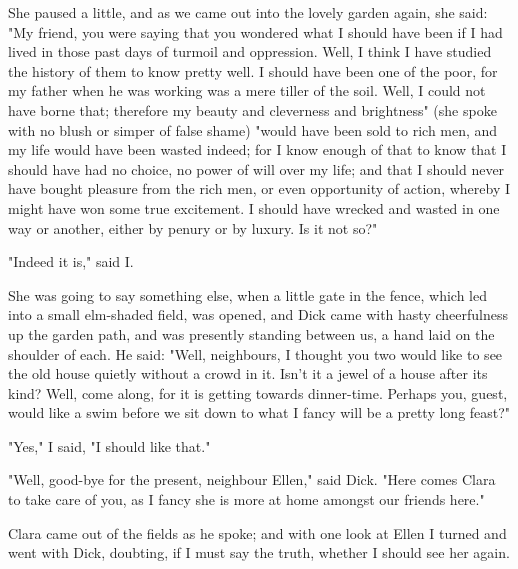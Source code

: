 She paused a little, and as we came out into the lovely garden again,
she said: "My friend, you were saying that you wondered what I should
have been if I had lived in those past days of turmoil and oppression.
Well, I think I have studied the history of them to know pretty well. I
should have been one of the poor, for my father when he was working was
a mere tiller of the soil. Well, I could not have borne that; therefore
my beauty and cleverness and brightness" (she spoke with no blush or
simper of false shame) "would have been sold to rich men, and my life
would have been wasted indeed; for I know enough of that to know that I
should have had no choice, no power of will over my life; and that I
should never have bought pleasure from the rich men, or even opportunity
of action, whereby I might have won some true excitement. I should have
wrecked and wasted in one way or another, either by penury or by luxury.
Is it not so?"

"Indeed it is," said I.

She was going to say something else, when a little gate in the fence,
which led into a small elm-shaded field, was opened, and Dick came with
hasty cheerfulness up the garden path, and was presently standing
between us, a hand laid on the shoulder of each. He said: "Well,
neighbours, I thought you two would like to see the old house quietly
without a crowd in it. Isn't it a jewel of a house after its kind? Well,
come along, for it is getting towards dinner-time. Perhaps you, guest,
would like a swim before we sit down to what I fancy will be a pretty
long feast?"

"Yes," I said, "I should like that."

"Well, good-bye for the present, neighbour Ellen," said Dick. "Here
comes Clara to take care of you, as I fancy she is more at home amongst
our friends here."

Clara came out of the fields as he spoke; and with one look at Ellen I
turned and went with Dick, doubting, if I must say the truth, whether I
should see her again.
